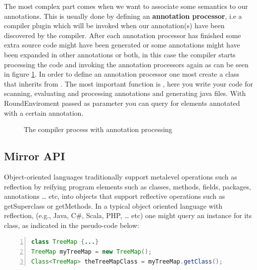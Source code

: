 	The most complex part comes when we want to associate some semantics 
to our annotations. This is usually done by defining an 
\textbf{annotation processor}, i.e a compiler plugin which will be invoked when
our annotation(s) have been discovered by the compiler. After each 
annotation processor has finished some extra source code might have been
generated or some annotations might have been expanded in other annotations or both, in 
this case the compiler starts processing the code and invoking the annotation
processors again as can be seen in figure \ref{fig:annProc}.
	 In order to define an annotation processor one most create a class that
inherits from . The
most important function is , here you write your code for scanning, evaluating 
and processing annotations and generating java files. With RoundEnviroment passed 
as parameter you can query for elements annotated with a certain annotation.
	
\begin{figure}
\centering
{}
\caption{The compiler process with annotation
processing\cite{figure:javac-flow}\label{fig:annProc}}
\end{figure}

\subsection{Mirror API}
	Object-oriented languages traditionally support metalevel operations such as
reflection by reifying program elements such as classes, methods, fields,
packages, annotations \ldots{} etc, into objects that support reflective
operations such as getSuperclass or getMethods.
	In a typical object oriented language with reflection, (e.g., Java, C\#,
Scala, PHP, \ldots{} etc) one might query an instance for its class, as
indicated in the pseudo-code below:
\small
\begin{lstlisting}[language=Java,numbers=left]
class TreeMap {...}
TreeMap myTreeMap = new TreeMap();
Class<TreeMap> theTreeMapClass = myTreeMap.getClass();
\end{lstlisting}
\normalsize{}

